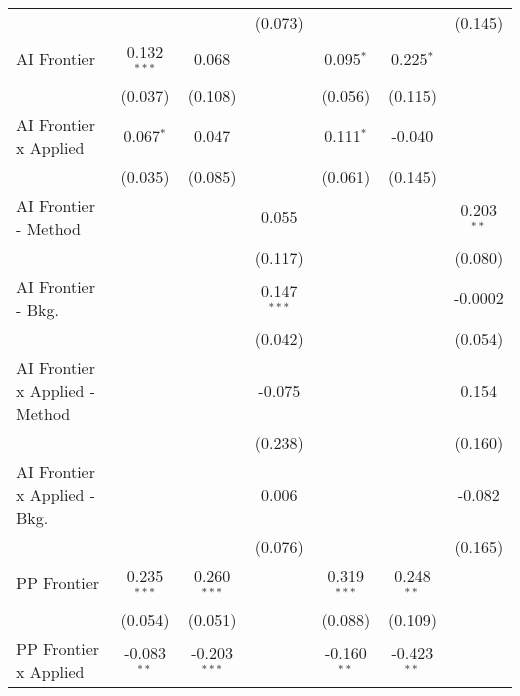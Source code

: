 \begin{tabular}{lcccccc}
                                  &                &                & (0.073)        &                &               & (0.145)\\   
   AI Frontier                    & 0.132$^{***}$  & 0.068          &                & 0.095$^{*}$    & 0.225$^{*}$   &   \\   
                                  & (0.037)        & (0.108)        &                & (0.056)        & (0.115)       &   \\   
   AI Frontier x Applied          & 0.067$^{*}$    & 0.047          &                & 0.111$^{*}$    & -0.040        &   \\   
                                  & (0.035)        & (0.085)        &                & (0.061)        & (0.145)       &   \\   
   AI Frontier - Method           &                &                & 0.055          &                &               & 0.203$^{**}$\\   
                                  &                &                & (0.117)        &                &               & (0.080)\\   
   AI Frontier - Bkg.             &                &                & 0.147$^{***}$  &                &               & -0.0002\\   
                                  &                &                & (0.042)        &                &               & (0.054)\\   
   AI Frontier x Applied - Method &                &                & -0.075         &                &               & 0.154\\   
                                  &                &                & (0.238)        &                &               & (0.160)\\   
   AI Frontier x Applied - Bkg.   &                &                & 0.006          &                &               & -0.082\\   
                                  &                &                & (0.076)        &                &               & (0.165)\\   
   PP Frontier                    & 0.235$^{***}$  & 0.260$^{***}$  &                & 0.319$^{***}$  & 0.248$^{**}$  &   \\   
                                  & (0.054)        & (0.051)        &                & (0.088)        & (0.109)       &   \\   
   PP Frontier x Applied          & -0.083$^{**}$  & -0.203$^{***}$ &                & -0.160$^{**}$  & -0.423$^{**}$ &   \\   

\end{tabular}
